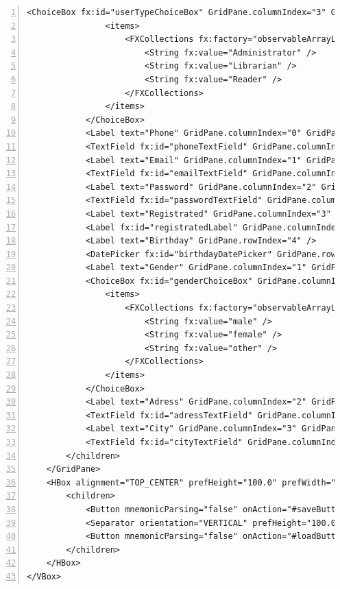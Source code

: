 \begin{lstlisting}[breaklines=true, numbers=left, stepnumber=1, label={lst:GUIuserDetailsForm}, caption={Account personal data form}]
            <ChoiceBox fx:id="userTypeChoiceBox" GridPane.columnIndex="3" GridPane.rowIndex="1">
                <items>
                    <FXCollections fx:factory="observableArrayList">
                        <String fx:value="Administrator" />
                        <String fx:value="Librarian" />
                        <String fx:value="Reader" />
                    </FXCollections>
                </items>
            </ChoiceBox>
            <Label text="Phone" GridPane.columnIndex="0" GridPane.rowIndex="2" />
            <TextField fx:id="phoneTextField" GridPane.columnIndex="0" GridPane.rowIndex="3" />
            <Label text="Email" GridPane.columnIndex="1" GridPane.rowIndex="2" />
            <TextField fx:id="emailTextField" GridPane.columnIndex="1" GridPane.rowIndex="3" />
            <Label text="Password" GridPane.columnIndex="2" GridPane.rowIndex="2" />
            <TextField fx:id="passwordTextField" GridPane.columnIndex="2" GridPane.rowIndex="3" />
            <Label text="Registrated" GridPane.columnIndex="3" GridPane.rowIndex="2" />
            <Label fx:id="registratedLabel" GridPane.columnIndex="3" GridPane.rowIndex="3"  text="Not available"/>
            <Label text="Birthday" GridPane.rowIndex="4" />
            <DatePicker fx:id="birthdayDatePicker" GridPane.rowIndex="5" />
            <Label text="Gender" GridPane.columnIndex="1" GridPane.rowIndex="4" />
            <ChoiceBox fx:id="genderChoiceBox" GridPane.columnIndex="1" GridPane.rowIndex="5">
                <items>
                    <FXCollections fx:factory="observableArrayList">
                        <String fx:value="male" />
                        <String fx:value="female" />
                        <String fx:value="other" />
                    </FXCollections>
                </items>
            </ChoiceBox>
            <Label text="Adress" GridPane.columnIndex="2" GridPane.rowIndex="4" />
            <TextField fx:id="adressTextField" GridPane.columnIndex="2" GridPane.rowIndex="5" />
            <Label text="City" GridPane.columnIndex="3" GridPane.rowIndex="4" />
            <TextField fx:id="cityTextField" GridPane.columnIndex="3" GridPane.rowIndex="5" />
        </children>
    </GridPane>
    <HBox alignment="TOP_CENTER" prefHeight="100.0" prefWidth="200.0">
        <children>
            <Button mnemonicParsing="false" onAction="#saveButtonOnAction" text="Save" />
            <Separator orientation="VERTICAL" prefHeight="100.0" prefWidth="25.0" visible="false" />
            <Button mnemonicParsing="false" onAction="#loadButtonOnAction" text="Load Current User" />
        </children>
    </HBox>
</VBox>
\end{lstlisting}


